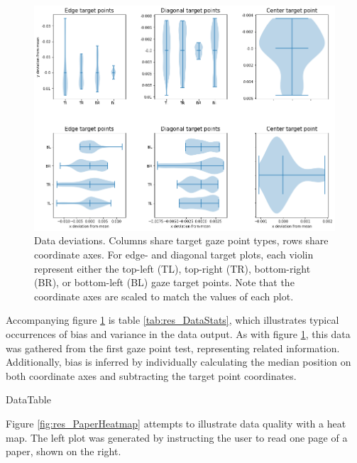 \begin{figure}[h]
    \centering
    \includegraphics[width=\textwidth]{Images/DataQuality/DataDeviations.png}
    \caption{Data deviations. Columns share target gaze point types, rows share coordinate axes. For edge- and diagonal target plots, each violin represent either the top-left (TL), top-right (TR), bottom-right (BR), or bottom-left (BL) gaze target points. Note that the coordinate axes are scaled to match the values of each plot.}
    \label{fig:res_DataDeviations}
\end{figure}

Accompanying figure \ref{fig:res_DataDeviations} is table \ref{tab:res_DataStats}, which illustrates typical occurrences of bias and variance in the data output. As with figure \ref{fig:res_DataDeviations}, this data was gathered from the first gaze point test, representing related information. Additionally, bias is inferred by individually calculating the median position on both coordinate axes and subtracting the target point coordinates.

{DataTable}

Figure \ref{fig:res_PaperHeatmap} attempts to illustrate data quality with a heat map. The left plot was generated by instructing the user to read one page of a paper, shown on the right. 

